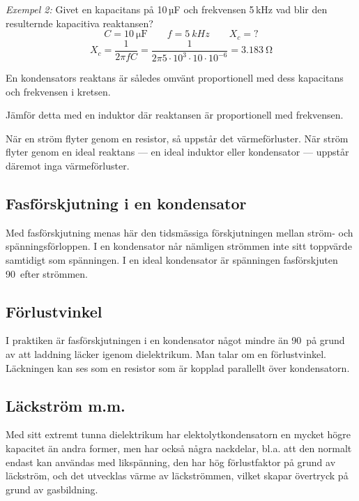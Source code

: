 \noindent\emph{Exempel 2:} Givet en kapacitans på 10\,µF och frekvensen 5\,kHz vad blir den resulternde kapacitiva reaktansen?
\[ C = \SI{10}{\micro\farad} \qquad f = \SI{5}{kHz} \qquad X_c = ? \]
\[
X_c = \frac{1}{2\pi f C} = \frac{1}{2\pi 5 \cdot 10^3 \cdot 10 \cdot 10^{-6}}
= \SI{3,183}{\ohm}
\]


En kondensators reaktans är således omvänt proportionell med dess kapacitans
och frekvensen i kretsen.

Jämför detta med en induktor där reaktansen är proportionell med frekvensen.

När en ström flyter genom en resistor, så uppstår det värmeförluster. När ström
flyter genom en ideal reaktans --- en ideal induktor eller kondensator --- uppstår
däremot inga värmeförluster.

\subsection{Fasförskjutning i en kondensator}

Med fasförskjutning menas här den tidsmässiga förskjutningen mellan ström- och
spänningsförloppen. I en kondensator når nämligen strömmen inte sitt toppvärde
samtidigt som spänningen.
I en ideal kondensator är spänningen fasförskjuten 90\degree~efter strömmen.

\subsection{Förlustvinkel}

I praktiken är fasförskjutningen i en kondensator något mindre än 90\degree\ på
grund av att laddning läcker igenom dielektrikum. Man talar om en förlustvinkel.
Läckningen kan ses som en resistor som är kopplad parallellt över kondensatorn.

\subsection{Läckström m.m.}

Med sitt extremt tunna dielektrikum har elektolytkondensatorn en mycket högre
kapacitet än andra former, men har också några nackdelar, bl.a. att den normalt
endast kan användas med likspänning, den har hög förlustfaktor på grund av läckström,
och det utvecklas värme av läckströmmen, vilket skapar övertryck på grund av
gasbildning.

